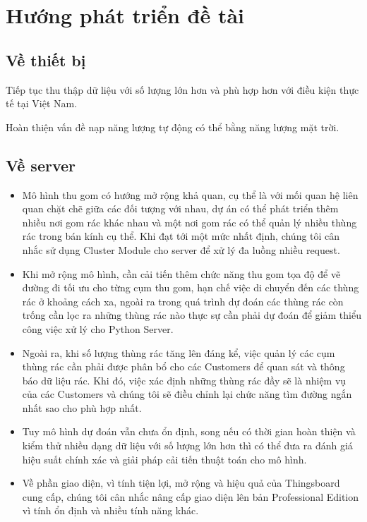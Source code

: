 \section{Hướng phát triển đề tài}
\subsection{Về thiết bị}
Tiếp tục thu thập dữ liệu với số lượng lớn hơn và phù hợp hơn với điều kiện thực tế tại Việt Nam.

Hoàn thiện vấn đề nạp năng lượng tự động có thể bằng năng lượng mặt trời.
\subsection{Về server}
\begin{itemize}
    \item Mô hình thu gom có hướng mở rộng khả quan, cụ thể là với mối quan hệ liên quan chặt chẽ giữa các đối tượng với nhau, dự án có thể phát triển thêm nhiều nơi gom rác khác nhau và một nơi gom rác có thể quản lý nhiều thùng rác trong bán kính cụ thể. Khi đạt tới một mức nhất định, chúng tôi cân nhắc sử dụng Cluster Module cho server để xử lý đa luồng nhiều request.
    \item Khi mở rộng mô hình, cần cải tiến thêm chức năng thu gom tọa độ để vẽ đường đi tối ưu cho từng cụm thu gom, hạn chế việc di chuyển đến các thùng rác ở khoảng cách xa, ngoài ra trong quá trình dự đoán các thùng rác còn trống cần lọc ra những thùng rác nào thực sự cần phải dự đoán để giảm thiểu công việc xử lý cho Python Server.
    \item Ngoài ra, khi số lượng thùng rác tăng lên đáng kể, việc quản lý các cụm thùng rác cần phải được phân bổ cho các Customers để quan sát và thông báo dữ liệu rác. Khi đó, việc xác định những thùng rác đầy sẽ là nhiệm vụ của các Customers và chúng tôi sẽ điều chỉnh lại chức năng tìm đường ngắn nhất sao cho phù hợp nhất. 
    \item Tuy mô hình dự đoán vẫn chưa ổn định, song nếu có thời gian hoàn thiện và kiểm thử nhiều dạng dữ liệu với số lượng lớn hơn thì có thể đưa ra đánh giá hiệu suất chính xác và giải pháp cải tiến thuật toán cho mô hình.   
    \item Về phần giao diện, vì tính tiện lợi, mở rộng và hiệu quả của Thingsboard cung cấp, chúng tôi cân nhắc nâng cấp giao diện lên bản Professional Edition vì tính ổn định và nhiều tính năng khác.
\end{itemize}